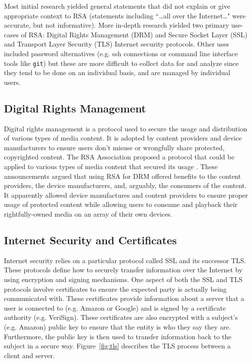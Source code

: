 \documentclass[smallextended]{svjour3}       %
\begin{document}
Most initial research yielded general statements that did not explain or give
appropriate context to RSA (statements including ``\dots all over the
Internet\dots" were accurate, but not informative). More in-depth research
yielded two primary use-cases of RSA: Digital Rights Management (DRM) and
Secure Socket Layer (SSL) and Transport Layer Security (TLS) Internet
security protocols. Other uses included password alternatives (e.g. ssh
connections or command line interface tools like \texttt{git}) but these are
more difficult to collect data for and analyze since they tend to be done on
an individual basis, and are managed by individual users.

\subsection{Digital Rights Management}
\label{subsec:drm}
Digital rights management is a protocol used to secure the usage and
distribution of various types of media content. It is adopted by content
providers and device manufacturers to ensure users don't misuse or wrongfully 
share protected, copyrighted content.
The RSA Association proposed a protocol that could be applied to various types
of media content that secured its usage \cite{rsa2004announces,rsa2004supports}. These announcements argued that using RSA for DRM offered
benefits to the content providers, the device manufacturers, and, arguably, the
consumers of the content. It apparently allowed device manufactures and
content providers to ensure proper usage of protected content while allowing
users to consume and playback their rightfully-owned media on an array of
their own devices.

\subsection{Internet Security and Certificates}
\label{subsec:netsec}
Internet security relies on a particular protocol called SSL and its successor
TLS. These protocols define how to securely transfer information over the
Internet by using encryption and signing mechanisms. One aspect of both the SSL
and TLS protocols involve certificates to ensure the expected party is
actually being communicated with. These certificates provide information
about a server that a user is connected to (e.g. Amazon or Google)
and is signed by a certificate authority (e.g. VeriSign). These certificates
are also encrypted with a subject's (e.g. Amazon) public key to ensure that
the entity is who they say they are. Furthermore, the public key is then used 
to transfer information back to the subject in a secure way.
Figure~\ref{fig:tls} describes the TLS process between a client and server. 
\end{document}
